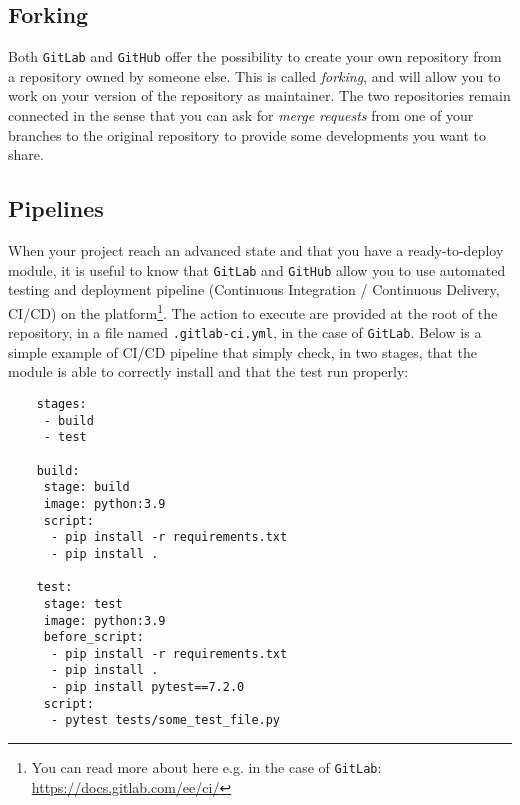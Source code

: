 \documentclass{article}
\begin{document}
\subsection{Forking}

Both \texttt{GitLab} and \texttt{GitHub} offer the possibility to create your own repository from a repository owned by someone else. This is called \textit{forking}, and will allow you to work on your version of the repository as maintainer. The two repositories remain connected in the sense that you can ask for \textit{merge requests} from one of your branches to the original repository to provide some developments you want to share.

\subsection{Pipelines}

When your project reach an advanced state and that you have a ready-to-deploy module, it is useful to know that \texttt{GitLab} and \texttt{GitHub} allow you to use automated testing and deployment pipeline (Continuous Integration / Continuous Delivery, CI/CD) on the platform\footnote{You can read more about here e.g. in the case of \texttt{GitLab}: \url{https://docs.gitlab.com/ee/ci/}}. 
The action to execute are provided at the root of the repository, in a file named \texttt{.gitlab-ci.yml}, in the case of \texttt{GitLab}.
Below is a simple example of CI/CD pipeline that simply check, in two stages, that the module is able to correctly install and that the test run properly:
\begin{lstlisting}
    stages:
     - build
     - test
    
    build:
     stage: build
     image: python:3.9
     script:
      - pip install -r requirements.txt
      - pip install .
    
    test:
     stage: test
     image: python:3.9
     before_script:
      - pip install -r requirements.txt
      - pip install .
      - pip install pytest==7.2.0
     script:
      - pytest tests/some_test_file.py

\end{lstlisting}
\end{document}
